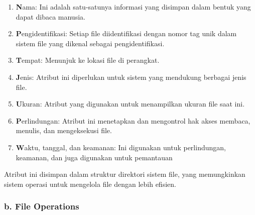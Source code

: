 \documentclass[12pt]{article}
\begin{document}
\begin{enumerate}
    \item \textbf Nama: Ini adalah satu-satunya informasi yang disimpan dalam bentuk yang dapat dibaca manusia.
    \item \textbf	Pengidentifikasi: Setiap file diidentifikasi dengan nomor tag unik dalam sistem file yang dikenal sebagai pengidentifikasi.
    \item \textbf Tempat: Menunjuk ke lokasi file di perangkat.	
    \item \textbf Jenis: Atribut ini diperlukan untuk sistem yang mendukung berbagai jenis file.
    \item \textbf Ukuran: Atribut yang digunakan untuk menampilkan ukuran file saat ini.	
    \item \textbf Perlindungan: Atribut ini menetapkan dan mengontrol hak akses membaca, menulis, dan mengeksekusi file.
    \item \textbf Waktu, tanggal, dan keamanan: Ini digunakan untuk perlindungan, keamanan, dan juga digunakan untuk pemantauan
\end{enumerate}

Atribut ini disimpan dalam struktur direktori sistem file, yang memungkinkan sistem operasi untuk mengelola file dengan lebih efisien.

\subsubsection*{b. File Operations}
\end{document}
